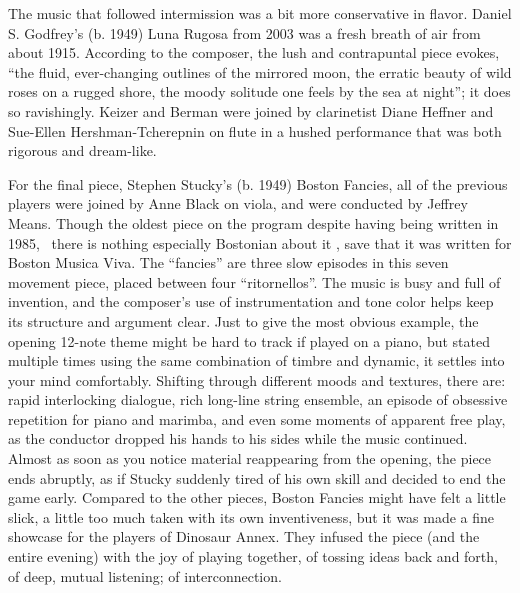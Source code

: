The music that followed intermission was a bit more conservative in flavor. Daniel S. Godfrey’s (b. 1949) Luna Rugosa from 2003 was a fresh breath of air from about 1915. According to the composer, the lush and contrapuntal piece evokes, “the fluid, ever-changing outlines of the mirrored moon, the erratic beauty of wild roses on a rugged shore, the moody solitude one feels by the sea at night”; it does so ravishingly. Keizer and Berman were joined by clarinetist Diane Heffner and Sue-Ellen Hershman-Tcherepnin on flute in a hushed performance that was both rigorous and dream-like.

For the final piece, Stephen Stucky’s (b. 1949) Boston Fancies, all of the previous players were joined by Anne Black on viola, and were conducted by Jeffrey Means. Though the oldest piece on the program despite having being written in 1985,  there is nothing especially Bostonian about it , save that it was written for Boston Musica Viva. The “fancies” are three slow episodes in this seven movement piece, placed between four “ritornellos”. The music is busy and full of invention, and the composer’s use of instrumentation and tone color helps keep its structure and argument clear. Just to give the most obvious example, the opening 12-note theme might be hard to track if played on a piano, but stated multiple times using the same combination of timbre and dynamic, it settles into your mind comfortably. Shifting through different moods and textures, there are: rapid interlocking dialogue, rich long-line string ensemble, an episode of obsessive repetition for piano and marimba, and even some moments of apparent free play, as the conductor dropped his hands to his sides while the music continued. Almost as soon as you notice material reappearing from the opening, the piece ends abruptly, as if Stucky suddenly tired of his own skill and decided to end the game early. Compared to the other pieces, Boston Fancies might have felt a little slick, a little too much taken with its own inventiveness, but it was made a fine showcase for the players of Dinosaur Annex. They infused the piece (and the entire evening) with the joy of playing together, of tossing ideas back and forth, of deep, mutual listening; of interconnection.
